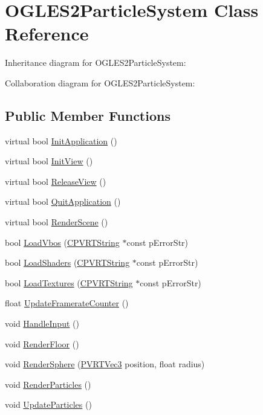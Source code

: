 \hypertarget{class_o_g_l_e_s2_particle_system}{\section{O\+G\+L\+E\+S2\+Particle\+System Class Reference}
\label{class_o_g_l_e_s2_particle_system}
}


Inheritance diagram for O\+G\+L\+E\+S2\+Particle\+System\+:


Collaboration diagram for O\+G\+L\+E\+S2\+Particle\+System\+:
\subsection*{Public Member Functions}
\begin{DoxyCompactItemize}
\item 
virtual bool \hyperlink{class_o_g_l_e_s2_particle_system_a2bd5fce49a2c0eaec77552f7eb7dcaf9}{Init\+Application} ()
\item 
virtual bool \hyperlink{class_o_g_l_e_s2_particle_system_aba60f37efa6e8e57ac7aabb42f48d8d2}{Init\+View} ()
\item 
virtual bool \hyperlink{class_o_g_l_e_s2_particle_system_ac879806e6e8b55b068e9ae41efca8ed0}{Release\+View} ()
\item 
virtual bool \hyperlink{class_o_g_l_e_s2_particle_system_afdda86d4fd891dfe24a6ac01422beefe}{Quit\+Application} ()
\item 
virtual bool \hyperlink{class_o_g_l_e_s2_particle_system_a39b3c65321ed741ee0f6ec1811bdd707}{Render\+Scene} ()
\item 
bool \hyperlink{class_o_g_l_e_s2_particle_system_accc12a8476c41444e1def4dd260a6e42}{Load\+Vbos} (\hyperlink{class_c_p_v_r_t_string}{C\+P\+V\+R\+T\+String} $\ast$const p\+Error\+Str)
\item 
bool \hyperlink{class_o_g_l_e_s2_particle_system_a8df815b339586c1917542e7da57c1818}{Load\+Shaders} (\hyperlink{class_c_p_v_r_t_string}{C\+P\+V\+R\+T\+String} $\ast$const p\+Error\+Str)
\item 
bool \hyperlink{class_o_g_l_e_s2_particle_system_a6f75d8ea3d0cfc91a9685ff652c24e02}{Load\+Textures} (\hyperlink{class_c_p_v_r_t_string}{C\+P\+V\+R\+T\+String} $\ast$const p\+Error\+Str)
\item 
float \hyperlink{class_o_g_l_e_s2_particle_system_a8ada9db43760ca465adf27645c477fd0}{Update\+Framerate\+Counter} ()
\item 
void \hyperlink{class_o_g_l_e_s2_particle_system_ac74594ef75aafbcb124a59a42973fb82}{Handle\+Input} ()
\item 
void \hyperlink{class_o_g_l_e_s2_particle_system_a91dae4866b7a83164a96d4b660e3339e}{Render\+Floor} ()
\item 
void \hyperlink{class_o_g_l_e_s2_particle_system_a02e2e5588e0d7de861f5b7abd9c79076}{Render\+Sphere} (\hyperlink{struct_p_v_r_t_vec3}{P\+V\+R\+T\+Vec3} position, float radius)
\item 
void \hyperlink{class_o_g_l_e_s2_particle_system_a1ae6bd3623b05871703e0986ddd8f527}{Render\+Particles} ()
\item 
void \hyperlink{class_o_g_l_e_s2_particle_system_acdf61ac408f50471f7cc082abbd2b762}{Update\+Particles} ()
\end{DoxyCompactItemize}
